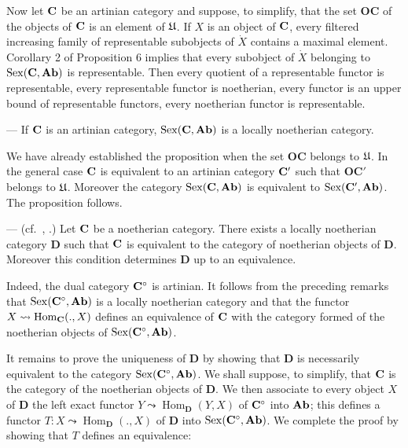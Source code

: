 Now let $\mathbf{C}$ be an artinian category and suppose, to simplify, that the
set $\mathbf{OC}$ of the objects of $\mathbf{C}$ is an element of $\mathfrak{U}$. If $X$
is an object of $\mathbf{C}$, every filtered increasing family of representable
subobjects of $\dot{X}$ contains a maximal element. Corollary 2 of
Proposition 6 implies that every subobject of $\dot{X}$ belonging to
$\operatorname{Sex}(\mathbf{C},\mathbf{Ab})$ is representable. Then every quotient of a
representable functor is representable, every representable functor is
noetherian, every functor is an upper bound of representable functors, every
noetherian functor is representable.

\begin{proposition}
--- If $\mathbf{C}$ is an artinian category, $\operatorname{Sex}(\mathbf{C},\mathbf{Ab})$ is a
locally noetherian category.
\end{proposition}

We have already established the proposition when the set $\mathbf{OC}$
belongs to $\mathfrak{U}$. In the general case $\mathbf{C}$ is equivalent to an artinian
category $\mathbf{C}'$ such that $\mathbf{OC}'$ belongs to $\mathfrak{U}$. Moreover the
category $\operatorname{Sex}(\mathbf{C},\mathbf{Ab})$ is equivalent to
$\operatorname{Sex}(\mathbf{C}',\mathbf{Ab})$. The proposition follows.

\begin{theorem}
--- (cf.\ \cite{grothendieck-2}, \cite{serre-groupes}.) Let $\mathbf{C}$ be a noetherian category. There exists a
locally noetherian category $\mathbf{D}$ such that $\mathbf{C}$ is equivalent to
the category of noetherian objects of $\mathbf{D}$. Moreover this condition
determines $\mathbf{D}$ up to an equivalence.
\end{theorem}

Indeed, the dual category $\mathbf{C}^{\circ}$ is artinian. It follows from the
preceding remarks that $\operatorname{Sex}(\mathbf{C}^{\circ},\mathbf{Ab})$ is a locally
noetherian category and that the functor
$X\leadsto \operatorname{Hom}_{\mathbf{C}}(.,X)$ defines an equivalence of
$\mathbf{C}$ with the category formed of the noetherian objects of
$\operatorname{Sex}(\mathbf{C}^{\circ},\mathbf{Ab})$.

It remains to prove the uniqueness of $\mathbf{D}$ by showing that $\mathbf{D}$
is necessarily equivalent to the category
$\operatorname{Sex}(\mathbf{C}^{\circ},\mathbf{Ab})$. We shall suppose, to simplify, that
$\mathbf{C}$ is the category of the noetherian objects of $\mathbf{D}$. We then
associate to every object $X$ of $\mathbf{D}$ the left exact functor
$Y\leadsto \operatorname{Hom}_{\mathbf{D}}(Y,X)$ of $\mathbf{C}^{\circ}$ into
$\mathbf{Ab}$; this defines a functor $T\colon
X\leadsto \operatorname{Hom}_{\mathbf{D}}(.,X)$ of $\mathbf{D}$ into
$\operatorname{Sex}(\mathbf{C}^{\circ},\mathbf{Ab})$. We complete the proof by showing
that $T$ defines an equivalence:

